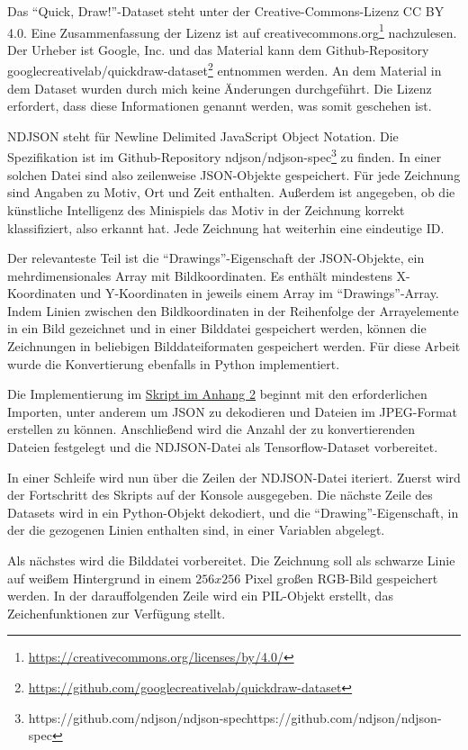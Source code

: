 Das ``Quick, Draw!''-Dataset steht unter der Creative-Commons-Lizenz CC BY 4.0. Eine Zusammenfassung der Lizenz ist auf creativecommons.org\footnote{\href{https://creativecommons.org/licenses/by/4.0/}{https://creativecommons.org/licenses/by/4.0/}} nachzulesen. Der Urheber ist Google, Inc. und das Material kann dem Github-Repository googlecreativelab/quickdraw-dataset\footnote{\href{https://github.com/googlecreativelab/quickdraw-dataset}{https://github.com/googlecreativelab/quickdraw-dataset}} entnommen werden. An dem Material in dem Dataset wurden durch mich keine Änderungen durchgeführt. Die Lizenz erfordert, dass diese Informationen genannt werden, was somit geschehen ist.

NDJSON steht für Newline Delimited JavaScript Object Notation. Die Spezifikation ist im Github-Repository ndjson/ndjson-spec\footnote{{https://github.com/ndjson/ndjson-spec}{https://github.com/ndjson/ndjson-spec}} zu finden. In einer solchen Datei sind also zeilenweise JSON-Objekte gespeichert. Für jede Zeichnung sind Angaben zu Motiv, Ort und Zeit enthalten. Außerdem ist angegeben, ob die künstliche Intelligenz des Minispiels das Motiv in der Zeichnung korrekt klassifiziert, also erkannt hat. Jede Zeichnung hat weiterhin eine eindeutige ID.

Der relevanteste Teil ist die ``Drawings''-Eigenschaft der JSON-Objekte, ein mehrdimensionales Array mit Bildkoordinaten. Es enthält mindestens X-Koordinaten und Y-Koordinaten in jeweils einem Array im ``Drawings''-Array. Indem Linien zwischen den Bildkoordinaten in der Reihenfolge der Arrayelemente in ein Bild gezeichnet und in einer Bilddatei gespeichert werden, können die Zeichnungen in beliebigen Bilddateiformaten gespeichert werden. Für diese Arbeit wurde die Konvertierung ebenfalls in Python implementiert.

Die Implementierung im \hyperref[ndjsonpy]{Skript im Anhang 2} beginnt mit den erforderlichen Importen, unter anderem um JSON zu dekodieren und Dateien im JPEG-Format erstellen zu können. Anschließend wird die Anzahl der zu konvertierenden Dateien festgelegt und die NDJSON-Datei als Tensorflow-Dataset vorbereitet.

In einer Schleife wird nun über die Zeilen der NDJSON-Datei iteriert. Zuerst wird der Fortschritt des Skripts auf der Konsole ausgegeben. Die nächste Zeile des Datasets wird in ein Python-Objekt dekodiert, und die ``Drawing''-Eigenschaft, in der die gezogenen Linien enthalten sind, in einer Variablen abgelegt.

Als nächstes wird die Bilddatei vorbereitet. Die Zeichnung soll als schwarze Linie auf weißem Hintergrund in einem $256x256$ Pixel großen RGB-Bild gespeichert werden. In der darauffolgenden Zeile wird ein PIL-Objekt erstellt, das Zeichenfunktionen zur Verfügung stellt.

